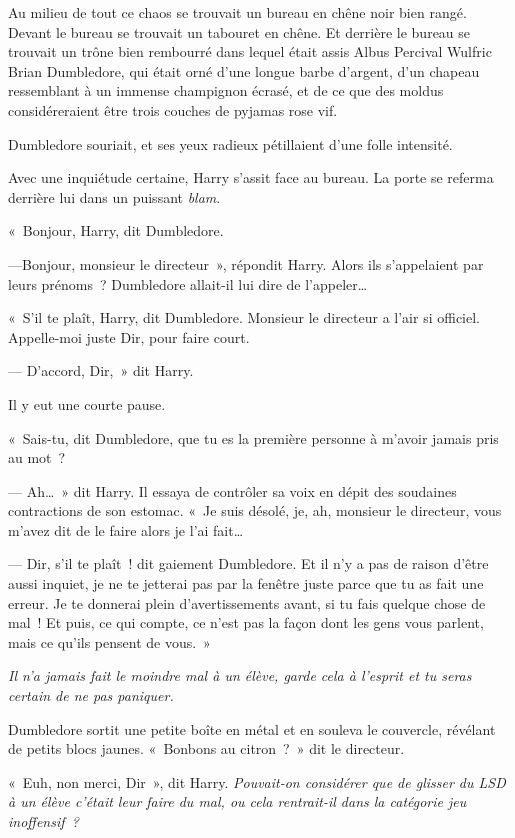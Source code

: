Au milieu de tout ce chaos se trouvait un bureau en chêne noir bien rangé. Devant le bureau se trouvait un tabouret en chêne. Et derrière le bureau se trouvait un trône bien rembourré dans lequel était assis Albus Percival Wulfric Brian Dumbledore, qui était orné d'une longue barbe d'argent, d'un chapeau ressemblant à un immense champignon écrasé, et de ce que des moldus considéreraient être trois couches de pyjamas rose vif.

Dumbledore souriait, et ses yeux radieux pétillaient d'une folle intensité.

Avec une inquiétude certaine, Harry s'assit face au bureau. La porte se referma derrière lui dans un puissant \emph{blam}.

«~Bonjour, Harry, dit Dumbledore.

---Bonjour, monsieur le directeur~», répondit Harry. Alors ils s'appelaient par leurs prénoms~? Dumbledore allait-il lui dire de l'appeler…

«~S'il te plaît, Harry, dit Dumbledore. Monsieur le directeur a l'air si officiel. Appelle-moi juste Dir, pour faire court.

--- D'accord, Dir,~» dit Harry.

Il y eut une courte pause.

«~Sais-tu, dit Dumbledore, que tu es la première personne à m'avoir jamais pris au mot~?

--- Ah…~» dit Harry. Il essaya de contrôler sa voix en dépit des soudaines contractions de son estomac. «~Je suis désolé, je, ah, monsieur le directeur, vous m'avez dit de le faire alors je l'ai fait…

--- Dir, s'il te plaît~! dit gaiement Dumbledore. Et il n'y a pas de raison d'être aussi inquiet, je ne te jetterai pas par la fenêtre juste parce que tu as fait une erreur. Je te donnerai plein d'avertissements avant, si tu fais quelque chose de mal~! Et puis, ce qui compte, ce n'est pas la façon dont les gens vous parlent, mais ce qu'ils pensent de vous.~»

\emph{Il n'a jamais fait le moindre mal à un élève, garde cela à l'esprit et tu seras certain de ne pas paniquer.}

Dumbledore sortit une petite boîte en métal et en souleva le couvercle, révélant de petits blocs jaunes. «~Bonbons au citron~?~» dit le directeur.

«~Euh, non merci, Dir~», dit Harry. \emph{Pouvait-on considérer que de glisser du LSD à un élève c'était leur faire du mal, ou cela rentrait-il dans la catégorie jeu inoffensif~?}

